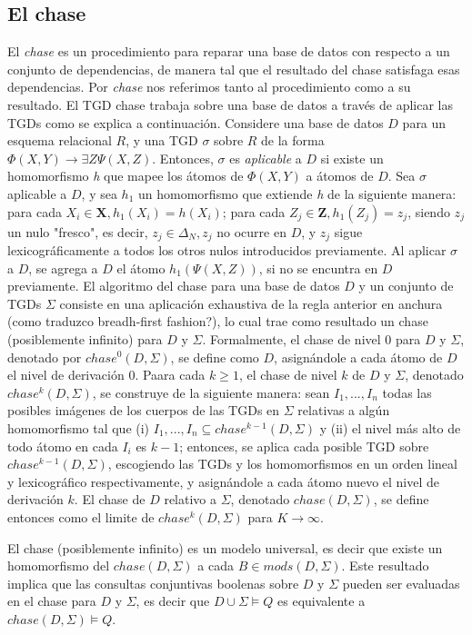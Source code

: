 \documentclass[11pt,a4paper,twoside]{tesis}
\begin{document}
\subsection{El chase}

El \textit{chase} es un procedimiento para reparar una base de datos con respecto a un conjunto de dependencias, de manera tal que el resultado del chase satisfaga esas dependencias. Por \textit{chase} nos referimos tanto al procedimiento como a su resultado. El TGD chase trabaja sobre una base de datos a través de aplicar las TGDs como se explica a continuación. Considere una base de datos $D$ para un esquema relacional $R$, y una TGD $\sigma$ sobre $R$ de la forma $\Phi (X, Y) \rightarrow \exists Z \Psi (X, Z)$. Entonces, $\sigma$ es \textit{aplicable} a $D$ si existe un homomorfismo \textit{h} que mapee los átomos de $\Phi (X, Y)$ a átomos de $D$. Sea $\sigma$ aplicable a $D$, y sea $h_1$ un homomorfismo que extiende \textit{h} de la siguiente manera: para cada $X_i \in \textbf{X}, h_1(X_i) = h(X_i)$; para cada $Z_j \in \textbf{Z}, h_1(Z_j) = z_j$, siendo $z_j$ un nulo "fresco", es decir, $z_j \in \Delta_N, z_j$ no ocurre en $D$, y $z_j$ sigue lexicográficamente a todos los otros nulos introducidos previamente. Al aplicar $\sigma$ a $D$, se agrega a $D$ el átomo $h_1(\Psi (X, Z))$, si no se encuntra en $D$ previamente.
El algoritmo del chase para una base de datos $D$ y un conjunto de TGDs $\Sigma$ consiste en una aplicación exhaustiva de la regla anterior en anchura (como traduzco breadh-first fashion?), lo cual trae como resultado un chase (posiblemente infinito) para $D$ y $\Sigma$. Formalmente, el chase de nivel 0 para $D$ y $\Sigma$, denotado por $chase^0(D,\Sigma)$, se define como $D$, asignándole a cada átomo de $D$ el nivel de derivación 0. Paara cada $k \geq 1$, el chase de nivel $k$ de $D$ y $\Sigma$, denotado $chase^k(D, \Sigma)$, se construye de la siguiente manera: sean $I_1,...,I_n$ todas las posibles imágenes de los cuerpos de las TGDs en $\Sigma$ relativas a algún homomorfismo tal que (i) $I_1,...,I_n \subseteq chase^{k-1}(D,\Sigma)$ y (ii) el nivel más alto de todo átomo en cada $I_i$ es $k - 1$; entonces, se aplica cada posible TGD sobre $chase^{k-1}(D,\Sigma)$, escogiendo las TGDs y los homomorfismos en un orden lineal y lexicográfico respectivamente, y asignándole a cada átomo nuevo el nivel de derivación $k$. El chase de $D$ relativo a $\Sigma$, denotado $chase(D,\Sigma)$, se define entonces como el limite de $chase^k(D,\Sigma)$ para $K \rightarrow \infty$. 

El chase (posiblemente infinito) es un modelo universal, es decir que existe un homomorfismo del $chase(D, \Sigma)$ a cada $B \in mods(D,\Sigma)$. Este resultado implica que las consultas conjuntivas boolenas sobre $D$ y $\Sigma$ pueden ser evaluadas en el chase para $D$ y $\Sigma$, es decir que $D \cup \Sigma \models Q$ es equivalente a $chase(D, \Sigma) \models Q$. 
\end{document}
